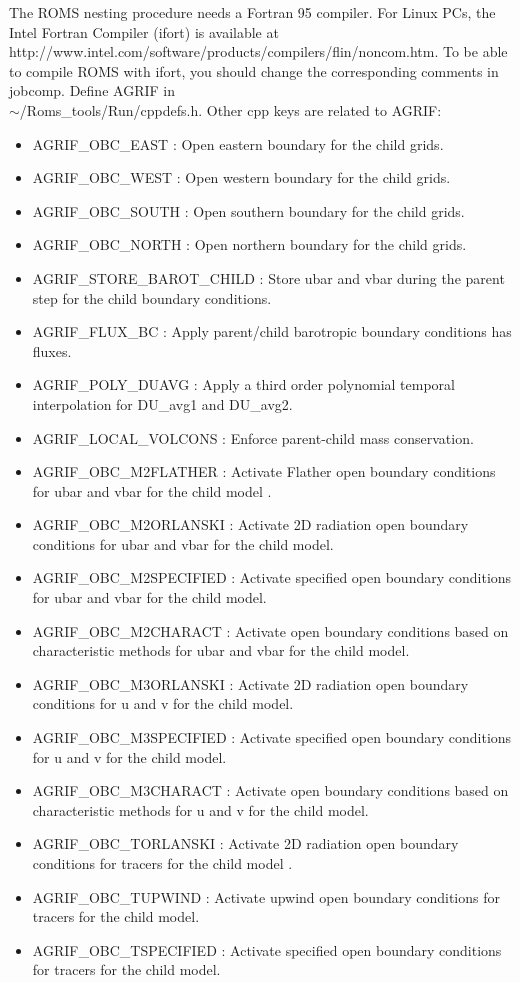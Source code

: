 The ROMS nesting procedure needs a Fortran 95 compiler. For Linux PCs,
the Intel Fortran Compiler (ifort) is available at \\
http://www.intel.com/software/products/compilers/flin/noncom.htm.
To be able to compile ROMS with ifort, you should change the corresponding 
comments in jobcomp. Define AGRIF in \\
$\sim$/Roms\_tools/Run/cppdefs.h.
Other cpp keys are related to AGRIF:
\begin{itemize}
\item AGRIF\_OBC\_EAST : Open eastern boundary for the child grids.
\item AGRIF\_OBC\_WEST : Open western boundary for the child grids.
\item AGRIF\_OBC\_SOUTH : Open southern boundary for the child grids.
\item AGRIF\_OBC\_NORTH : Open northern boundary for the child grids.
\item AGRIF\_STORE\_BAROT\_CHILD : Store ubar and vbar during the parent step for the
child boundary conditions.
\item AGRIF\_FLUX\_BC : Apply parent/child barotropic boundary conditions has 
fluxes.
\item AGRIF\_POLY\_DUAVG : Apply a third order polynomial temporal interpolation 
for DU\_avg1 and DU\_avg2.
\item AGRIF\_LOCAL\_VOLCONS : Enforce parent-child mass conservation.
\item AGRIF\_OBC\_M2FLATHER :  Activate Flather open boundary conditions for ubar and vbar
for the child model .
\item AGRIF\_OBC\_M2ORLANSKI : Activate 2D radiation open boundary conditions for ubar and vbar
for the child model.
\item AGRIF\_OBC\_M2SPECIFIED : Activate specified open boundary conditions for ubar and vbar
for the child model.
\item AGRIF\_OBC\_M2CHARACT :  Activate open boundary conditions based on characteristic methods 
for ubar and vbar
for the child model.
\item AGRIF\_OBC\_M3ORLANSKI : Activate 2D radiation open boundary conditions for u and v
for the child model.
\item AGRIF\_OBC\_M3SPECIFIED : Activate specified open boundary conditions for u and v
for the child model.
\item AGRIF\_OBC\_M3CHARACT : Activate open boundary conditions based on characteristic methods 
for u and v
for the child model.
\item AGRIF\_OBC\_TORLANSKI :  Activate 2D radiation open boundary conditions for tracers
for the child model .
\item AGRIF\_OBC\_TUPWIND : Activate upwind open boundary conditions for tracers
for the child model.
\item AGRIF\_OBC\_TSPECIFIED  : Activate specified open boundary conditions for tracers
for the child model.
\end{itemize}
